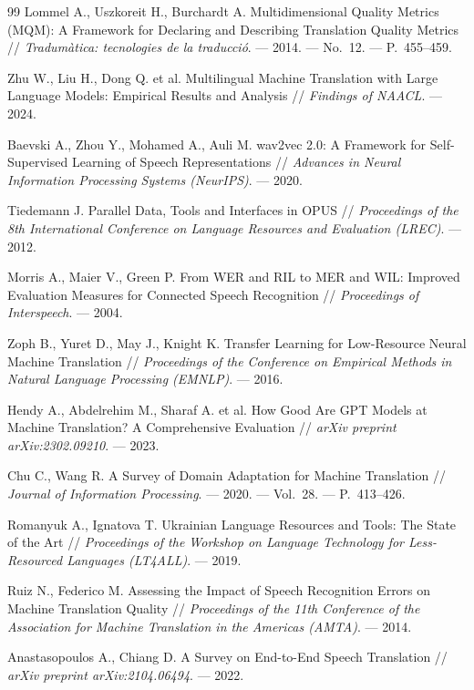 \begin{thebibliography}{99}
Lommel A., Uszkoreit H., Burchardt A.
Multidimensional Quality Metrics (MQM): A Framework for Declaring and
Describing Translation Quality Metrics //
\textit{Tradumàtica: tecnologies de la traducció}. --- 2014. --- No.~12.
--- P.~455--459.

Zhu W., Liu H., Dong Q. et al.
Multilingual Machine Translation with Large Language Models: Empirical
Results and Analysis //
\textit{Findings of NAACL}. --- 2024.

Baevski A., Zhou Y., Mohamed A., Auli M.
wav2vec 2.0: A Framework for Self-Supervised Learning of Speech
Representations //
\textit{Advances in Neural Information Processing Systems (NeurIPS)}. --- 2020.

Tiedemann J.
Parallel Data, Tools and Interfaces in OPUS //
\textit{Proceedings of the 8th International Conference on Language
Resources and Evaluation (LREC)}. --- 2012.

Morris A., Maier V., Green P.
From WER and RIL to MER and WIL: Improved Evaluation Measures for
Connected Speech Recognition //
\textit{Proceedings of Interspeech}. --- 2004.

Zoph B., Yuret D., May J., Knight K.
Transfer Learning for Low-Resource Neural Machine Translation //
\textit{Proceedings of the Conference on Empirical Methods in Natural
Language Processing (EMNLP)}. --- 2016.

Hendy A., Abdelrehim M., Sharaf A. et al.
How Good Are GPT Models at Machine Translation? A Comprehensive Evaluation //
\textit{arXiv preprint arXiv:2302.09210}. --- 2023.

Chu C., Wang R.
A Survey of Domain Adaptation for Machine Translation //
\textit{Journal of Information Processing}. --- 2020. --- Vol.~28.
--- P.~413--426.

Romanyuk A., Ignatova T.
Ukrainian Language Resources and Tools: The State of the Art //
\textit{Proceedings of the Workshop on Language Technology for
Less-Resourced Languages (LT4ALL)}. --- 2019.

Ruiz N., Federico M.
Assessing the Impact of Speech Recognition Errors on Machine Translation
Quality //
\textit{Proceedings of the 11th Conference of the Association for Machine
Translation in the Americas (AMTA)}. --- 2014.

Anastasopoulos A., Chiang D.
A Survey on End-to-End Speech Translation //
\textit{arXiv preprint arXiv:2104.06494}. --- 2022.

\end{thebibliography}